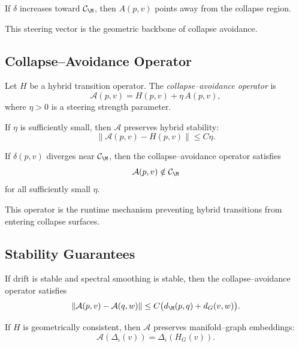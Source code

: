 \begin{lemma}
If $\delta$ increases toward $\mathcal{C}_\M$, then $A(p,v)$ points away
from the collapse region.
\end{lemma}

\begin{remark}
This steering vector is the geometric backbone of collapse avoidance.
\end{remark}

\subsection{Collapse--Avoidance Operator}

\begin{definition}
Let $H$ be a hybrid transition operator.  
The \emph{collapse--avoidance operator} is
\[
\mathcal{A}(p,v)
= H(p,v) + \eta\, A(p,v),
\]
where $\eta > 0$ is a steering strength parameter.
\end{definition}

\begin{lemma}
If $\eta$ is sufficiently small, then $\mathcal{A}$ preserves hybrid
stability:
\[
\| \mathcal{A}(p,v) - H(p,v) \|
\le C \eta.
\]
\end{lemma}

\begin{theorem}
If $\delta(p,v)$ diverges near $\mathcal{C}_\M$, then the collapse--avoidance
operator satisfies
\[
\mathcal{A}(p,v) \notin \mathcal{C}_\M
\]
for all sufficiently small $\eta$.
\end{theorem}

\begin{remark}
This operator is the runtime mechanism preventing hybrid transitions from
entering collapse surfaces.
\end{remark}

\subsection{Stability Guarantees}

\begin{theorem}
If drift is stable and spectral smoothing is stable, then the
collapse--avoidance operator satisfies
\[
\| \mathcal{A}(p,v) - \mathcal{A}(q,w) \|
\le C \big( d_\M(p,q) + d_G(v,w) \big).
\]
\end{theorem}

\begin{lemma}
If $H$ is geometrically consistent, then $\mathcal{A}$ preserves
manifold--graph embeddings:
\[
\mathcal{A}(\Delta_\iota(v)) = \Delta_\iota(H_G(v)).
\]
\end{lemma}

